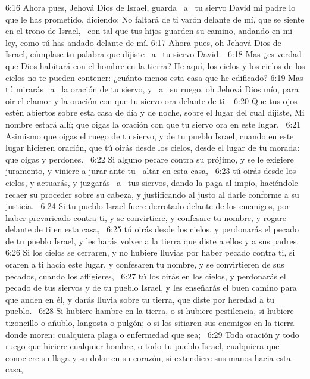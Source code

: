 						6:16 Ahora pues, Jehová Dios de Israel, guarda  a  tu siervo David mi padre lo que le has prometido, diciendo: No faltará de ti varón delante de mí, que se siente en el trono de Israel,  con tal que tus hijos guarden su camino, andando en mi ley, como tú has andado delante de mí. 
						6:17 Ahora pues, oh Jehová Dios de Israel, cúmplase tu palabra que dijiste  a  tu siervo David.  
						6:18 Mas ¿es verdad que Dios habitará con el hombre en la tierra? He aquí, los cielos y los cielos de los cielos no te pueden contener: ¿cuánto menos esta casa que he edificado? 
						6:19 Mas tú mirarás  a  la oración de tu siervo, y  a  su ruego, oh Jehová Dios mío, para oir el clamor y la oración con que tu siervo ora delante de ti.  
						6:20 Que tus ojos estén abiertos sobre esta casa de día y de noche, sobre el lugar del cual dijiste, Mi nombre estará allí; que oigas la oración con que tu siervo ora en este lugar.  
						6:21 Asimismo que oigas el ruego de tu siervo, y de tu pueblo Israel, cuando en este lugar hicieren oración, que tú oirás desde los cielos, desde el lugar de tu morada: que oigas y perdones.  
						6:22 Si alguno pecare contra su prójimo, y se le exigiere juramento, y viniere a jurar ante tu  altar en esta casa,  
						6:23 tú oirás desde los cielos, y actuarás, y juzgarás  a  tus siervos, dando la paga al impío, haciéndole recaer su proceder sobre su cabeza, y justificando al justo al darle conforme a su justicia.  
						6:24 Si tu pueblo Israel fuere derrotado delante de los enemigos, por haber prevaricado contra ti, y se convirtiere, y confesare tu nombre, y rogare delante de ti en esta casa,  
						6:25 tú oirás desde los cielos, y perdonarás el pecado de tu pueblo Israel, y les harás volver a la tierra que diste a ellos y a sus padres.  
						6:26 Si los cielos se cerraren, y no hubiere lluvias por haber pecado contra ti, si oraren a ti hacia este lugar, y confesaren tu nombre, y se convirtieren de sus pecados, cuando los afligieres,  
						6:27 tú los oirás en los cielos, y perdonarás el pecado de tus siervos y de tu pueblo Israel, y les enseñarás el buen camino para que anden en él, y darás lluvia sobre tu tierra, que diste por heredad a tu pueblo.  
						6:28 Si hubiere hambre en la tierra, o si hubiere pestilencia, si hubiere tizoncillo o añublo, langosta o pulgón; o si los sitiaren sus enemigos en la tierra donde moren; cualquiera plaga o enfermedad que sea;  
						6:29 Toda oración y todo ruego que hiciere cualquier hombre, o todo tu pueblo Israel, cualquiera que conociere su llaga y su dolor en su corazón, si extendiere sus manos hacia esta casa,  
